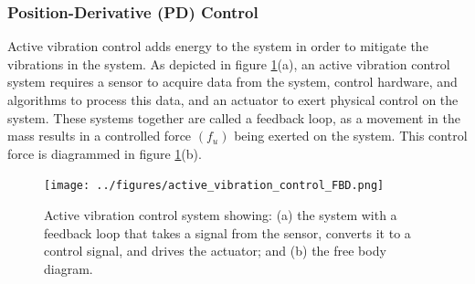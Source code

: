 \documentclass[12pt,letter]{article}
\begin{document}
\subsubsection{Position-Derivative (PD) Control}
Active vibration control adds energy to the system in order to mitigate the vibrations in the system. As depicted in figure \ref{fig:active_vibration_control_FBD}(a), an active vibration control system requires a sensor to acquire data from the system, control hardware, and algorithms to process this data, and an actuator to exert physical control on the system. These systems together are called a feedback loop, as a movement in the mass results in a controlled force $(f_u)$ being exerted on the system. This control force is diagrammed in figure \ref{fig:active_vibration_control_FBD}(b). 

\begin{figure}[H]
    \centering
	\vspace{-2ex}
    \texttt{[image: ../figures/active\_vibration\_control\_FBD.png]}
	\vspace{-2ex}
    \caption{Active vibration control system showing: (a) the system with a feedback loop that takes a signal from the sensor, converts it to a control signal, and drives the actuator; and (b) the free body diagram.}
    \label{fig:active_vibration_control_FBD}
\end{figure}
\end{document}
